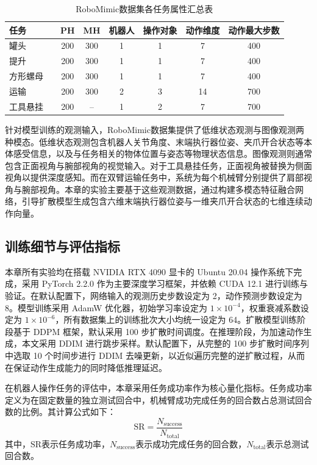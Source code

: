 \begin{table}[H]
  \centering
  \caption{RoboMimic数据集各任务属性汇总表}
  \label{tab:robomimic_summary}
  \begin{tabular}{lccccccc} 
    \toprule
    任务 &  & PH & MH & 机器人 & 操作对象 & 动作维度 & 动作最大步数 \\ %
    \midrule
    罐头       &  & 200 & 300 & 1 & 1 &  7 & 400 \\
    提升      &  & 200 & 300 & 1 & 1 &  7 & 400 \\
    方形螺母    &  & 200 & 300 & 1 & 1 &  7 & 400 \\
    运输 &  & 200 & 300 & 2 & 3 & 14 & 700 \\
    工具悬挂 &  & 200 & --  & 1 & 2 &  7 & 700 \\
    \bottomrule
  \end{tabular}
\end{table}

针对模型训练的观测输入，RoboMimic数据集提供了低维状态观测与图像观测两种模态。低维状态观测包含机器人关节角度、末端执行器位姿、夹爪开合状态等本体感受信息，以及与任务相关的物体位置与姿态等物理状态信息。图像观测则通常包含正面视角与腕部视角的视觉输入。对于工具悬挂任务，正面视角被替换为侧面视角以提供深度感知。而在双臂运输任务中，系统为每个机械臂分别提供了肩部视角与腕部视角。本章的实验主要基于这些观测数据，通过构建多模态特征融合网络，引导扩散模型生成包含六维末端执行器位姿与一维夹爪开合状态的七维连续动作向量。

\subsection{训练细节与评估指标}
\label{subsec:training_details_metrics}

本章所有实验均在搭载 NVIDIA RTX 4090 显卡的 Ubuntu 20.04 操作系统下完成，采用 PyTorch 2.2.0 作为主要深度学习框架，并依赖 CUDA 12.1 进行训练与验证。在默认配置下，网络输入的观测历史步数设定为 2，动作预测步数设定为 8。模型训练采用 AdamW 优化器，初始学习率设定为 $1 \times 10^{-4}$，权重衰减系数设定为 $1 \times 10^{-6}$，所有数据集上的训练批次大小均统一设定为 64。扩散模型训练阶段基于 DDPM 框架，默认采用 100 步扩散时间调度。在推理阶段，为加速动作生成，本文采用 DDIM 进行跳步采样。默认配置下，从完整的 100 步扩散时间序列中选取 10 个时间步进行 DDIM 去噪更新，以近似遍历完整的逆扩散过程，从而在保证动作生成能力的同时降低推理延迟。

在机器人操作任务的评估中，本章采用任务成功率作为核心量化指标。任务成功率定义为在固定数量的独立测试回合中，机械臂成功完成任务的回合数占总测试回合数的比例。其计算公式如下：
\begin{equation}
  \text{SR} = \frac{N_{\text{success}}}{N_{\text{total}}}
\end{equation}
其中，$\text{SR}$表示任务成功率，$N_{\text{success}}$表示成功完成任务的回合数，$N_{\text{total}}$表示总测试回合数。

